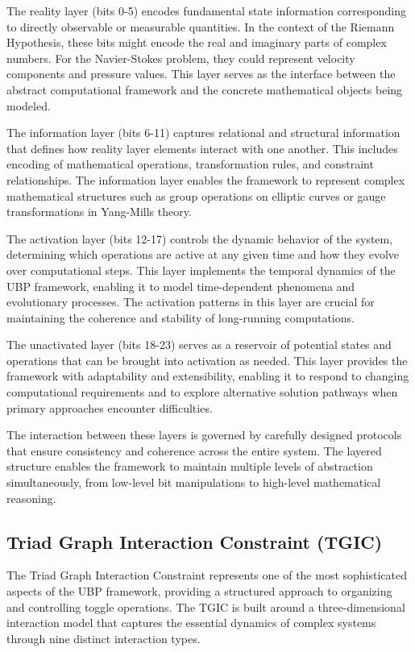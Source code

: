 \documentclass[11pt]{amsart}
\begin{document}
The reality layer (bits 0-5) encodes fundamental state information corresponding to directly observable or measurable quantities. In the context of the Riemann Hypothesis, these bits might encode the real and imaginary parts of complex numbers. For the Navier-Stokes problem, they could represent velocity components and pressure values. This layer serves as the interface between the abstract computational framework and the concrete mathematical objects being modeled.

The information layer (bits 6-11) captures relational and structural information that defines how reality layer elements interact with one another. This includes encoding of mathematical operations, transformation rules, and constraint relationships. The information layer enables the framework to represent complex mathematical structures such as group operations on elliptic curves or gauge transformations in Yang-Mills theory.

The activation layer (bits 12-17) controls the dynamic behavior of the system, determining which operations are active at any given time and how they evolve over computational steps. This layer implements the temporal dynamics of the UBP framework, enabling it to model time-dependent phenomena and evolutionary processes. The activation patterns in this layer are crucial for maintaining the coherence and stability of long-running computations.

The unactivated layer (bits 18-23) serves as a reservoir of potential states and operations that can be brought into activation as needed. This layer provides the framework with adaptability and extensibility, enabling it to respond to changing computational requirements and to explore alternative solution pathways when primary approaches encounter difficulties.

The interaction between these layers is governed by carefully designed protocols that ensure consistency and coherence across the entire system. The layered structure enables the framework to maintain multiple levels of abstraction simultaneously, from low-level bit manipulations to high-level mathematical reasoning.

\subsection{Triad Graph Interaction Constraint (TGIC)}

The Triad Graph Interaction Constraint represents one of the most sophisticated aspects of the UBP framework, providing a structured approach to organizing and controlling toggle operations. The TGIC is built around a three-dimensional interaction model that captures the essential dynamics of complex systems through nine distinct interaction types.
\end{document}
